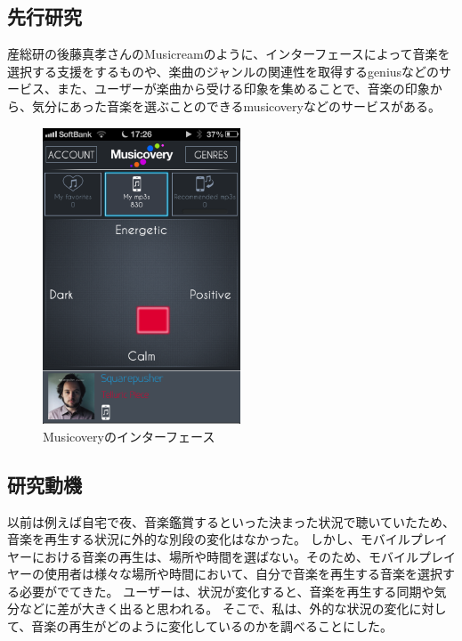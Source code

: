 \documentclass[11pt, twocolumn]{jsarticle}
\begin{document}
\subsection{先行研究}
産総研の後藤真孝さんのMusicreamのように、インターフェースによって音楽を選択する支援をするものや、楽曲のジャンルの関連性を取得するgeniusなどのサービス、また、ユーザーが楽曲から受ける印象を集めることで、音楽の印象から、気分にあった音楽を選ぶことのできるmusicoveryなどのサービスがある。

\begin{figure}[h]
\begin{center}
\includegraphics[width=5.866cm]{musicovery.png}
\caption{Musicoveryのインターフェース}
\label{musicovery_interface}
\end{center}
\end{figure}

\subsection{研究動機}

以前は例えば自宅で夜、音楽鑑賞するといった決まった状況で聴いていたため、音楽を再生する状況に外的な別段の変化はなかった。
しかし、モバイルプレイヤーにおける音楽の再生は、場所や時間を選ばない。そのため、モバイルプレイヤーの使用者は様々な場所や時間において、自分で音楽を再生する音楽を選択する必要がでてきた。
ユーザーは、状況が変化すると、音楽を再生する同期や気分などに差が大きく出ると思われる。
そこで、私は、外的な状況の変化に対して、音楽の再生がどのように変化しているのかを調べることにした。
\end{document}

